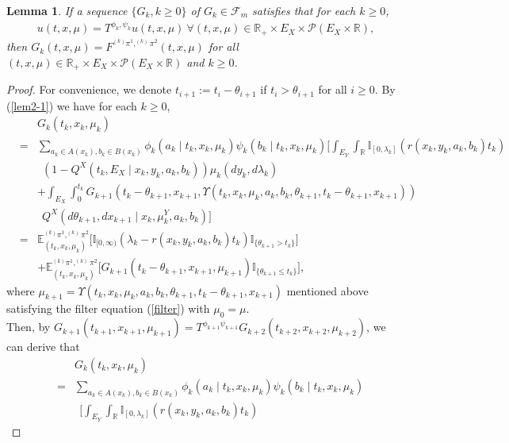 \documentclass[12pt]{article}
\newtheorem{lemma}{Lemma}
\begin{document}
\begin{lemma}\label{lem2}
 If a sequence $\{G_k,k\ge0\}$ of $G_k\in\mathscr{F}_m$ satisfies that for each $k\ge0$,
\begin{eqnarray}\label{lem2-1}
u(t,x,\mu)
=T^{\phi_k,\psi_k}u(t,x,\mu)~
\forall (t,x,\mu)\in \mathbb{R}_+\times E_X\times \mathscr{P}(E_X\times \mathbb{R}),
 \end{eqnarray}
then
$G_k(t,x,\mu)=F^{^{(k)}\pi^1,^{(k)}\pi^2}(t,x,\mu)$ for all $(t,x,\mu)\in \mathbb{R}_+\times E_X\times \mathscr{P}(E_X\times \mathbb{R})$ and $k\ge 0$.
\end{lemma}
\begin{proof} For convenience, we denote $t_{i+1}:=t_i-\theta_{i+1}$ if $t_i>\theta_{i+1}$ for all $i\ge 0$.
By (\ref{lem2-1}) we have for each $k\ge0$,
\begin{eqnarray*}
&&G_k(t_k,x_k,\mu_k)\\
&=&\sum_{a_k\in A(x_k), b_k\in B(x_k)}\phi_k(a_k\mid t_k,x_k,\mu_k)\psi_k(b_k\mid t_k,x_k,\mu_k)
\big[\int_{E_Y}\int_{\mathbb{R}}\mathbb{I}_{[0,\lambda_k]}(r(x_k,y_k,a_k,b_k)t_k)\\
&&~~(1-Q^X(t_k,E_X\mid x_k,y_k,a_k,b_k))\mu_k(dy_k,d\lambda_k)\\
&&+\int_{E_X}\int_0^{t_k} G_{k+1}
(t_k-\theta_{k+1},x_{k+1},
\Upsilon(t_k,x_k,\mu_k,a_k,b_k,\theta_{k+1},t_k-\theta_{k+1},x_{k+1}))\\
&&~~Q^X(d\theta_{k+1},dx_{k+1}\mid x_k,\mu_k^Y,a_k,b_k)\big]\\
&=&\mathbb{E}^{^{(k)}\pi^1,^{(k)}\pi^2}_{(t_k,x_k,\mu_k)}
\big[\mathbb{I}_{[0,\infty)}(\lambda_k -r(x_k,y_k,a_k,b_k)t_k)\mathbb{I}_{\{\theta_{k+1}>t_k\}}\big]\\
&&+\mathbb{E}^{^{(k)}\pi^1,^{(k)}\pi^2}_{(t_k,x_k,\mu_k)}
\big[G_{k+1}(t_k-\theta_{k+1},x_{k+1},\mu_{k+1})\mathbb{I}_{\{\theta_{k+1}\leq t_k\}}\big],
\end{eqnarray*}
where $\mu_{k+1}=\Upsilon(t_k,x_k,\mu_k,a_k,b_k,\theta_{k+1},t_k-\theta_{k+1},x_{k+1})$ mentioned above satisfying the filter equation (\ref{filter}) with $\mu_0=\mu$.
\\
Then, by $G_{k+1}(t_{k+1},x_{k+1},\mu_{k+1})=T^{\phi_{k+1}\psi_{k+1}}
G_{k+2}(t_{k+2},x_{k+2},\mu_{k+2})$, we can derive that
\begin{eqnarray}\label{lem2-2}
&&G_k(t_k,x_k,\mu_k)\nonumber\\
&=&\sum_{a_k\in A(x_k), b_k\in B(x_k)}\phi_k(a_k\mid t_k,x_k,\mu_k)\psi_k(b_k\mid t_k,x_k,\mu_k)\nonumber\\
&&~~\big[\int_{E_Y}\int_{\mathbb{R}}\mathbb{I}_{[0,\lambda_k]}(r(x_k,y_k,a_k,b_k)t_k)

\end{eqnarray}
\end{proof}
\end{document}
